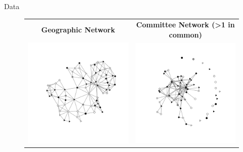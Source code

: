 \documentclass[final]{beamer}
\newlength{\onecolwid}
\newlength{\onecolwidd}
\begin{document}
\begin{frame}[t]
\begin{columns}[t]
\begin{column}{\onecolwidd}
\begin{block}{Data}
\begin{rmfamily}
	\hspace{2cm}
	\begin{figure}
	\centering
	\begin{tabular}{cc}
	{\bf Geographic Network} & {\bf Committee Network (>1 in common)}\\
	\includegraphics[scale=0.9, clip=true,trim =2cm 2cm 2cm 2cm ]{coppock_geographic_net.pdf} & 						\includegraphics[scale=0.9, clip=true,trim =2cm 2cm 2cm 2cm]{nm_committee_net.pdf} \\ 

\end{tabular}
\end{figure}
\end{rmfamily}
\end{block}
\end{column}
\end{columns}
\end{frame}
\end{document}

